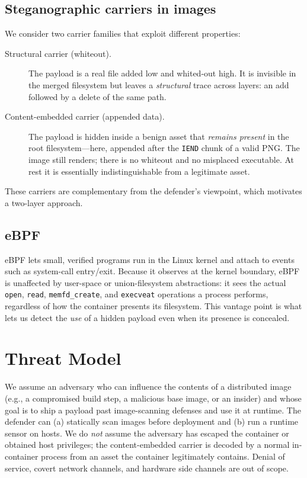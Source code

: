 \documentclass[sigconf,nonacm]{acmart}
\begin{document}
\subsection{Steganographic carriers in images}
We consider two carrier families that exploit different properties:
\begin{description}
\item[Structural carrier (whiteout).] The payload is a real file added low and
whited-out high. It is invisible in the merged filesystem but leaves a
\emph{structural} trace across layers: an add followed by a delete of the same
path.
\item[Content-embedded carrier (appended data).] The payload is hidden inside a
benign asset that \emph{remains present} in the root filesystem---here, appended
after the \texttt{IEND} chunk of a valid PNG. The image still renders; there is
no whiteout and no misplaced executable. At rest it is essentially indistinguishable
from a legitimate asset.
\end{description}
These carriers are complementary from the defender's viewpoint, which motivates a
two-layer approach.

\subsection{eBPF}
eBPF lets small, verified programs run in the Linux kernel and attach to events
such as system-call entry/exit. Because it observes at the kernel boundary, eBPF
is unaffected by user-space or union-filesystem abstractions: it sees the actual
\texttt{open}, \texttt{read}, \texttt{memfd\_create}, and \texttt{execveat}
operations a process performs, regardless of how the container presents its
filesystem. This vantage point is what lets us detect the \emph{use} of a hidden
payload even when its presence is concealed.

\section{Threat Model}
We assume an adversary who can influence the contents of a distributed image
(e.g., a compromised build step, a malicious base image, or an insider) and whose
goal is to ship a payload past image-scanning defenses and use it at runtime. The
defender can (a) statically scan images before deployment and (b) run a runtime
sensor on hosts. We do \emph{not} assume the adversary has escaped the container
or obtained host privileges; the content-embedded carrier is decoded by a normal
in-container process from an asset the container legitimately contains. Denial of
service, covert network channels, and hardware side channels are out of scope.
\end{document}
